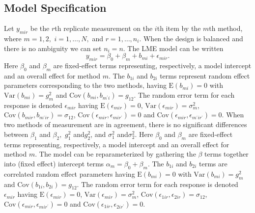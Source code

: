 \documentclass[12pt, a4paper]{article}
\theoremstyle{plain}
\theoremstyle{definition}
\theoremstyle{remark}
\begin{document}
	\subsection{Model Specification}
	Let $y_{mir} $ be the $r$th replicate measurement on the $i$th item by the $m$th method, where $m=1,2,$ $i=1,\ldots,N,$ and $r = 1,\ldots,n_i.$ When the design is balanced and there is no ambiguity we can set $n_i=n.$ The LME model can be written
	\begin{equation}
	y_{mir} = \beta_{0} + \beta_{m} + b_{mi} + \epsilon_{mir}.
	\end{equation}
	Here $\beta_0$ and $\beta_m$ are fixed-effect terms representing, respectively, a model intercept and an overall effect for method $m.$ The $b_{1i}$ and $b_{2i}$ terms represent random effect parameters corresponding to the two methods, having $\mathrm{E}(b_{mi})=0$ with $\mathrm{Var}(b_{mi})=g^2_m$ and $\mathrm{Cov}(b_{mi}, b_{m^\prime i})=g_{12}.$ The random error term for each response is denoted $\epsilon_{mir}$ having $\mathrm{E}(\epsilon_{mir})=0$, $\mathrm{Var}(\epsilon_{mir})=\sigma^2_m$, $\mathrm{Cov}(b_{mir}, b_{m^\prime ir})=\sigma_{12}$, $\mathrm{Cov}(\epsilon_{mir}, \epsilon_{mir^\prime})= 0$ and $\mathrm{Cov}(\epsilon_{mir}, \epsilon_{m^\prime ir^\prime})= 0.$
	When two methods of measurement are in agreement, there is no significant differences between $\beta_1$ and $\beta_2,$ $g^2_1 $ and$ g^2_2$, and $\sigma^2_1 $ and$ \sigma^2_2$.
	\bigskip
	Here $\beta_0$ and $\beta_m$ are fixed-effect terms representing, respectively, a model intercept and an overall effect for method $m.$ The model can be reparameterized by gathering the $\beta$ terms together into (fixed effect) intercept terms $\alpha_m=\beta_0+\beta_m.$ The $b_{1i}$ and $b_{2i}$ terms are correlated random effect parameters having $\mathrm{E}(b_{mi})=0$ with $\mathrm{Var}(b_{mi})=g^2_m$ and $\mathrm{Cov}(b_{1i}, b_{2 i})=g_{12}.$ The random error term for each response is denoted $\epsilon_{mir}$ having $\mathrm{E}(\epsilon_{mir})=0$, $\mathrm{Var}(\epsilon_{mir})=\sigma^2_m$, $\mathrm{Cov}(\epsilon_{1ir}, \epsilon_{2 ir})=\sigma_{12}$, $\mathrm{Cov}(\epsilon_{mir}, \epsilon_{mir^\prime})= 0$ and $\mathrm{Cov}(\epsilon_{1ir}, \epsilon_{2 ir^\prime})= 0.$ 
	
\end{document}
